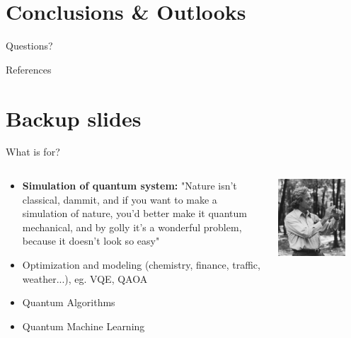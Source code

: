 \documentclass[aspectratio=169,10pt]{beamer}
\begin{document}
\section{Conclusions \& Outlooks}

\begin{frame}[t,standout]
\Large
Questions?
\end{frame}


\begin{frame}{References}
    \printbibliography
\end{frame}


\section*{Backup slides}

\begin{frame}{What is for?}
  \begin{columns}
    \begin{column}{0.5\textwidth}
      \begin{itemize}[label=\textbullet]
        \item \textbf{Simulation of quantum system:} "Nature isn't classical, dammit, and if you want to make a simulation of nature, you'd better make it quantum mechanical, and by golly it's a wonderful problem, because it doesn't look so easy"
        \item Optimization and modeling (chemistry, finance, traffic, weather...), eg. VQE, QAOA
        \item Quantum Algorithms 
        \item Quantum Machine Learning
      \end{itemize}
      \end{column}
      \begin{column}{0.5\textwidth}
        \begin{center}
            \includegraphics[width=0.8\textwidth]{figures/feynmann.jpg}

\end{center}
\end{column}
\end{columns}
\end{frame}
\end{document}
